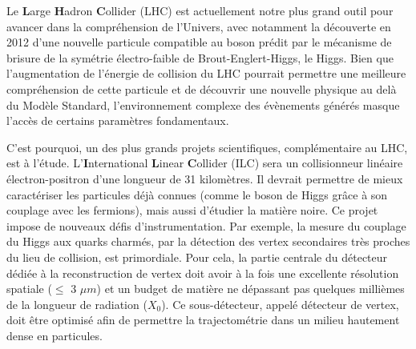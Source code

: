 \documentclass[a4papper, 10pt]{article}
\begin{document}

        Le \textbf{L}arge \textbf{H}adron \textbf{C}ollider (LHC) est actuellement notre plus grand outil pour avancer dans la compréhension de l'Univers, avec notamment la découverte en 2012 d'une nouvelle particule compatible au boson prédit par le mécanisme de brisure de la symétrie électro-faible de Brout-Englert-Higgs, le Higgs. Bien que l'augmentation de l'énergie de collision du LHC pourrait permettre une meilleure compréhension de cette particule et de découvrir une nouvelle
        physique au delà du Modèle Standard, l'environnement complexe des évènements générés masque l'accès de certains paramètres fondamentaux.  
        
        C'est pourquoi, un des plus grands projets scientifiques, complémentaire au LHC, est à l'étude. L'\textbf{I}n\-ter\-na\-tio\-nal \textbf{L}inear \textbf{C}ollider (ILC) sera un collisionneur linéaire électron-positron d'une longueur de 31 kilomètres. Il devrait permettre de mieux caractériser les particules déjà connues (comme le boson de Higgs grâce à son couplage avec les fermions), mais aussi d'étudier la matière noire. Ce projet impose de nouveaux défis d'instrumentation. 
        Par exemple, la mesure du couplage du Higgs aux quarks charmés, par la détection des vertex secondaires très proches du lieu de collision, est primordiale. Pour cela, la partie centrale du détecteur dédiée à la reconstruction de vertex doit avoir à la fois une excellente résolution spatiale ($\leq$ 3 $\mu m$) et un budget de matière ne dépassant pas quelques millièmes de la longueur de radiation ($X_0$). Ce sous-détecteur, appelé détecteur de vertex, doit être optimisé afin de permettre la trajectométrie dans un milieu hautement dense en particules. 
      
\end{document}

